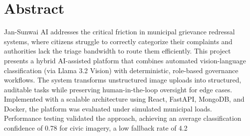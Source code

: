 \chapter*{Abstract}

Jan-Sunwai AI addresses the critical friction in municipal grievance redressal systems, where citizens struggle to correctly categorize their complaints and authorities lack the triage bandwidth to route them efficiently. This project presents a hybrid AI-assisted platform that combines automated vision-language classification (via Llama 3.2 Vision) with deterministic, role-based governance workflows. The system transforms unstructured image uploads into structured, auditable tasks while preserving human-in-the-loop oversight for edge cases. Implemented with a scalable architecture using React, FastAPI, MongoDB, and Docker, the platform was evaluated under simulated municipal loads. Performance testing validated the approach, achieving an average classification confidence of 0.78 for civic imagery, a low fallback rate of 4.2%